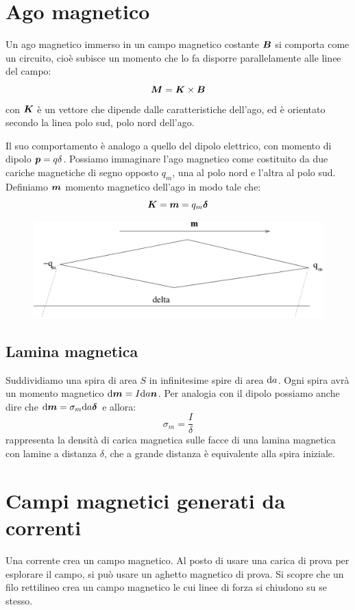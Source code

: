 \section{Ago magnetico}
Un ago magnetico immerso in un campo magnetico costante $\boldsymbol{B}$ si comporta come un circuito, cioè subisce un momento che lo fa disporre parallelamente alle linee del campo:
\begin{equation*}\boldsymbol{M}=\boldsymbol{K}\times\boldsymbol{B}\end{equation*}
con $\boldsymbol{K}$ è un vettore che dipende dalle caratteristiche dell'ago, ed è orientato secondo la linea polo sud, polo nord dell'ago.

Il suo comportamento è analogo a quello del dipolo elettrico, con momento di dipolo $\boldsymbol{p}=q\delta$. Possiamo immaginare l'ago magnetico come costituito da due cariche magnetiche di segno opposto $q_m$, una al polo nord e l'altra al polo sud. Definiamo $\boldsymbol{m}$ momento magnetico dell'ago in modo tale che:
\begin{equation*}\boldsymbol{K}=\boldsymbol{m}=q_m \boldsymbol{\delta}\end{equation*}
\begin{figure}[htbp]
\centering
\includegraphics[scale=0.5]{immagini/fisica2/ago}
\end{figure}
\subsection{Lamina magnetica}
Suddividiamo una spira di area $S$ in infinitesime spire di area $\mathrm{d} a$. Ogni spira avrà un momento magnetico $\mathrm{d}\boldsymbol{m}=I\mathrm{d} a\boldsymbol{n}$. Per analogia con il dipolo possiamo anche dire che $\mathrm{d}\boldsymbol{m}=\sigma_m\mathrm{d} a \boldsymbol{\delta}$ e allora:
\begin{equation*}\sigma_m=\frac{I}{\delta}\end{equation*}
rappresenta la densità di carica magnetica sulle facce di una lamina magnetica con lamine a distanza $\delta$, che a grande distanza è equivalente alla spira iniziale.

\section{Campi magnetici generati da correnti}
Una corrente crea un campo magnetico. Al posto di usare una carica di prova per esplorare il campo, si può usare un aghetto magnetico di prova. Si scopre che un filo rettilineo crea un campo magnetico le cui linee di forza si chiudono su se stesso.
